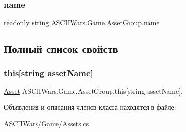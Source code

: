 \subsubsection{\texorpdfstring{name}{name}}
{\footnotesize\ttfamily readonly string A\+S\+C\+I\+I\+Wars.\+Game.\+Asset\+Group.\+name}



\subsection{Полный список свойств}
\hypertarget{class_a_s_c_i_i_wars_1_1_game_1_1_asset_group_ada6ec78bb13c41b4f8309f91b4adeecc}{}\label{class_a_s_c_i_i_wars_1_1_game_1_1_asset_group_ada6ec78bb13c41b4f8309f91b4adeecc} 
\subsubsection{\texorpdfstring{this[string asset\+Name]}{this[string assetName]}}
{\footnotesize\ttfamily \hyperlink{class_a_s_c_i_i_wars_1_1_game_1_1_asset}{Asset} A\+S\+C\+I\+I\+Wars.\+Game.\+Asset\+Group.\+this\mbox{[}string asset\+Name\mbox{]}\hspace{0.3cm}{\ttfamily [get]}, {\ttfamily [set]}}



Объявления и описания членов класса находятся в файле\+:\begin{DoxyCompactItemize}
\item 
A\+S\+C\+I\+I\+Wars/\+Game/\hyperlink{_assets_8cs}{Assets.\+cs}\end{DoxyCompactItemize}
